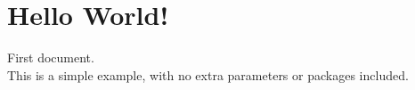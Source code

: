 \documentclass[12pt]{article}
\begin{document}
\thispagestyle{empty}
\vspace*{1.7in}
\section*{\LARGE Hello World!}
\begin{flushleft}
  { \large
    First document.
    \vspace{0.15in}\\
    This is a simple example, with no
    extra parameters or packages included.
  }
\end{flushleft}
\end{document}
